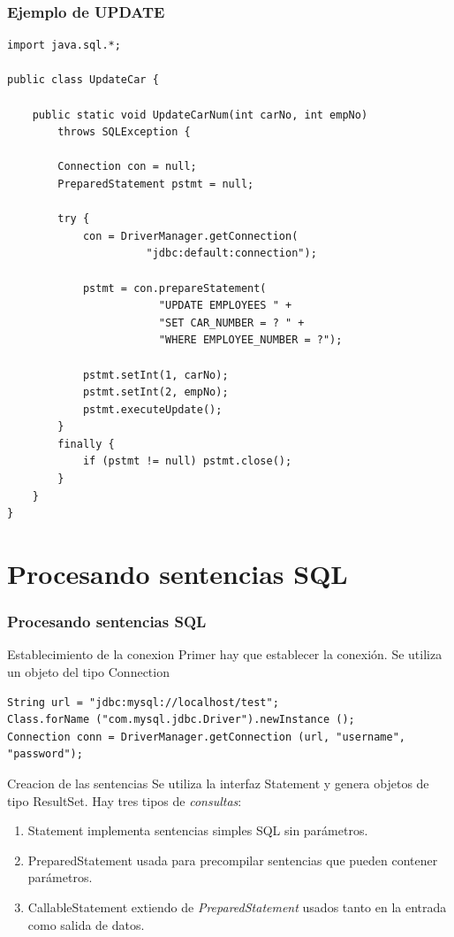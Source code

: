 \documentclass{beamer}
\begin{document}
\begin{frame}[fragile]
\frametitle{Ejemplo de UPDATE}
\begin{tiny}
\begin{verbatim}
import java.sql.*;

public class UpdateCar {

    public static void UpdateCarNum(int carNo, int empNo)
        throws SQLException {

        Connection con = null;
        PreparedStatement pstmt = null;   
      
        try {
            con = DriverManager.getConnection(
                      "jdbc:default:connection");

            pstmt = con.prepareStatement(
                        "UPDATE EMPLOYEES " +
                        "SET CAR_NUMBER = ? " +
                        "WHERE EMPLOYEE_NUMBER = ?");

            pstmt.setInt(1, carNo);
            pstmt.setInt(2, empNo);
            pstmt.executeUpdate();
        }
        finally {
            if (pstmt != null) pstmt.close();
        }
    }
}
\end{verbatim}
\end{tiny}
\end{frame}

\section{Procesando sentencias SQL}
\begin{frame}[fragile]
\frametitle{Procesando sentencias SQL} 
\begin{block}{Establecimiento de la conexion}
Primer hay que establecer la conexión. Se utiliza un objeto del tipo \alert{Connection}
\pause
\begin{scriptsize}
\begin{verbatim}
String url = "jdbc:mysql://localhost/test";
Class.forName ("com.mysql.jdbc.Driver").newInstance ();
Connection conn = DriverManager.getConnection (url, "username", "password");
\end{verbatim}
\end{scriptsize}
\end{block} 
\pause
\begin{block}{Creacion de las sentencias}
Se utiliza la interfaz \alert{Statement} y genera objetos de tipo \alert{ResultSet}. Hay tres tipos de \emph{consultas}:
\begin{enumerate}[<+->]
\item \alert{Statement} implementa sentencias simples SQL sin parámetros.
\item \alert{PreparedStatement} usada para precompilar sentencias que pueden contener parámetros.
\item \alert{CallableStatement} extiendo de \emph{PreparedStatement} usados tanto en la entrada como salida de datos.
\end{enumerate}
\end{block}
\end{frame}
\end{document}
